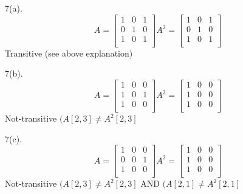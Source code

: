 \documentclass[10pt]{article}
\begin{document}
7(a).
$$A = 
\begin{bmatrix}
1 & 0 & 1 \\
0 & 1 & 0 \\
1 & 0 & 1 \\
\end{bmatrix}
A^2 = 
\begin{bmatrix}
1 & 0 & 1 \\
0 & 1 & 0 \\
1 & 0 & 1 \\
\end{bmatrix}
$$
Transitive (see above explanation)

7(b).
$$A = 
\begin{bmatrix}
1 & 0 & 0 \\
1 & 0 & 1 \\
1 & 0 & 0 \\
\end{bmatrix}
A^2 = 
\begin{bmatrix}
1 & 0 & 0 \\
1 & 0 & 0 \\
1 & 0 & 0 \\
\end{bmatrix}
$$
Not-transitive $(A[2,3] \neq A^2[2,3]$

7(c).
$$A = 
\begin{bmatrix}
1 & 0 & 0 \\
0 & 0 & 1 \\
1 & 0 & 0 \\
\end{bmatrix}
A^2 = 
\begin{bmatrix}
1 & 0 & 0 \\
1 & 0 & 0 \\
1 & 0 & 0 \\
\end{bmatrix}
$$
Not-transitive $(A[2,3] \neq A^2[2,3]$ AND $(A[2,1] \neq A^2[2,1]$
\end{document}
